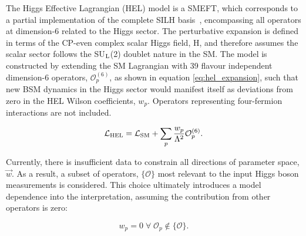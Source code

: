 The Higgs Effective Lagrangian (HEL) model is a SMEFT, which corresponds to a partial implementation of the complete SILH basis~\cite{}, encompassing all operators at dimension-6 related to the Higgs sector. The perturbative expansion is defined in terms of the CP-even complex scalar Higgs field, H, and therefore assumes the scalar sector follows the SU$_{\rm{L}}$(2) doublet nature in the SM. The model is constructed by extending the SM Lagrangian with 39 flavour independent dimension-6 operators, $\mathcal{O}^{(6)}_p$, as shown in equation \ref{eq:hel_expansion}, such that new BSM dynamics in the Higgs sector would manifest itself as deviations from zero in the HEL Wilson coefficients, $w_p$. Operators representing four-fermion interactions are not included.



\begin{equation}\label{eq:hel_expansion}
    \mathcal{L}_{\rm{HEL}} = \mathcal{L}_{\rm{SM}} + \sum_p \frac{w_p}{\Lambda^2}\mathcal{O}^{(6)}_p .
\end{equation}

\noindent
Currently, there is insufficient data to constrain all directions of parameter space, $\vec{w}$. As a result, a subset of operators, $\{\mathcal{O}\}$  most relevant to the input Higgs boson measurements is considered. This choice ultimately introduces a model dependence into the interpretation, assuming the contribution from other operators is zero: 

\begin{equation}
  w_p=0 \; \forall \; \mathcal{O}_p \notin \{\mathcal{O}\}.   
\end{equation}

